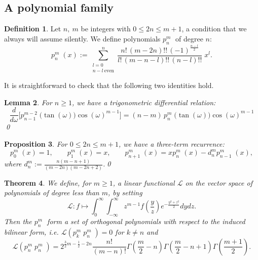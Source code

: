 \documentclass{amsart}
\newcommand{\ie}{{\it i.e. }}
\newcommand{\p}[2]{p_{#1}^{#2}\;\!\!}
\renewcommand{\L}{\mathcal{L}}
\newcommand{\coloneqq}{:=}
\theoremstyle{plain}
\newtheorem{theorem}{Theorem}[section]
\newtheorem{lemma}[theorem]{Lemma}
\newtheorem{proposition}[theorem]{Proposition}
\theoremstyle{definition}
\newtheorem{definition}[theorem]{Definition}
\theoremstyle{remark}
\begin{document}
\subsection{A polynomial family}
\begin{definition} Let $n,\ m$ be integers with $0\leq 2n\leq m+1$, a condition that we always will assume silently. We define polynomials $\p{n}{m}$ of degree $n$:
\begin{equation}
\p{n}{m}(x) \coloneqq \sum_{\substack{l=0\\ n-l\ \text{even}}}^n \frac{n!\,(m-2n)!!\,(-1)^{\frac{n-l}{2}}}{l!\,(m-n-l)!!\,(n-l)!!}\;x^l.
\end{equation}
\end{definition}
It is straightforward to check that the following two identities hold.
\begin{lemma} \label{trigonometric}
For $n\geq 1$, we have a trigonometric differential relation:
\begin{equation}
\frac{d}{d\omega} \Big[\p{n-1}{m-2}\big(\tan(\omega)\big)\cos(\omega)^{m-1} \Big]= (n-m)\, \p{n}{m}\big(\tan(\omega)\big)\cos(\omega)^{m-1}
\end{equation} \qed
\end{lemma}
\begin{proposition} \label{threeterm} For $0\leq 2n\leq m+1$, we have a three-term recurrence:
\begin{equation}
\p{0}{m}(x) = 1,\qquad \p{1}{m}(x) = x, \qquad \p{n+1}{m}(x) = x\p{n}{m}(x) -d_n^m \p{n-1}{m}(x),
\end{equation} 
where $d_n^m\coloneqq \frac{n(m-n+1)}{(m-2n)(m-2n+2)}$.\qed
\end{proposition}
\begin{theorem} \label{pthm}We define, for $m\geq 1$, a linear functional $\L$ on the vector space of polynomials of degree less than $m$, by setting
\begin{equation}
\L: f \longmapsto \int_0^\infty\!\!\! \int_{-\infty}^\infty z^{m-1}f\left(\frac{y}{z}\right) e^{-\frac{y^2+z^2}{2}} dydz.
\end{equation}
Then the $\p{n}{m}$ form a set of orthogonal polynomials with respect to the induced bilinear form, \ie $\L(\p{k}{m}\p{n}{m})=0$ for $k\neq n$ and 
\begin{equation} \label{Lpn2}
\L(\p{n}{m}\p{n}{m}) = 2^{\frac{3}{2}m-\frac{1}{2}-2n}  \frac{n!}{(m-n)!}
\Gamma\left(\frac{m}{2}-n\right)\Gamma\left(\frac{m}{2}-n+1\right)\Gamma\left(\frac{m+1}{2}\right).
\end{equation}
\end{theorem}
\end{document}
